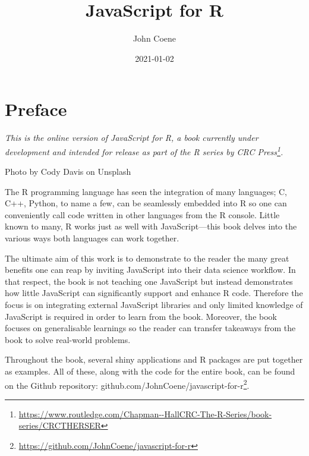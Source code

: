 \documentclass[
  10pt,
]{krantz}
\title{JavaScript for R}
\author{John Coene}
\date{2021-01-02}
\renewcommand{\href}[2]{#2\footnote{\url{#1}}}
\begin{document}
\maketitle


\thispagestyle{empty}

\begin{center}
\end{center}

\setlength{\abovedisplayskip}{-5pt}
\setlength{\abovedisplayshortskip}{-5pt}

{
\hypersetup{linkcolor=}
\setcounter{tocdepth}{2}
\tableofcontents
}
\listoftables
\listoffigures
\hypertarget{preface}{%
\chapter*{Preface}\label{preface}}


\emph{This is the online version of JavaScript for R, a book currently under development and intended for release as part of the \href{https://www.routledge.com/Chapman--HallCRC-The-R-Series/book-series/CRCTHERSER}{R series by CRC Press}.}

{Photo by Cody Davis on Unsplash}

The R programming language has seen the integration of many languages; C, C++, Python, to name a few, can be seamlessly embedded into R so one can conveniently call code written in other languages from the R console. Little known to many, R works just as well with JavaScript---this book delves into the various ways both languages can work together.

The ultimate aim of this work is to demonstrate to the reader the many great benefits one can reap by inviting JavaScript into their data science workflow. In that respect, the book is not teaching one JavaScript but instead demonstrates how little JavaScript can significantly support and enhance R code. Therefore the focus is on integrating external JavaScript libraries and only limited knowledge of JavaScript is required in order to learn from the book. Moreover, the book focuses on generalisable learnings so the reader can transfer takeaways from the book to solve real-world problems.

Throughout the book, several shiny applications and R packages are put together as examples. All of these, along with the code for the entire book, can be found on the Github repository: \href{https://github.com/JohnCoene/javascript-for-r}{github.com/JohnCoene/javascript-for-r}.
\end{document}
